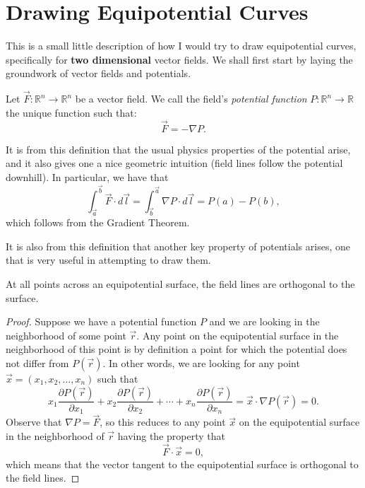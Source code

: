 \documentclass[a4paper, 12pt]{article}
\begin{document}
\section*{Drawing Equipotential Curves}

This is a small little description of how I would try to draw equipotential curves, specifically for \textbf{two dimensional} vector fields. We shall first start by laying the groundwork of vector fields and potentials.

\begin{sidebox}
    \begin{definition}
            Let \( \vec{F} \colon \mathbb{R}^n \to \mathbb{R}^n \) be a vector field. We call the field's \textit{potential function} \( P \colon \mathbb{R}^n \to \mathbb{R} \) the unique function such that:
        \[
            \vec{F} = - \nabla P
        .\]
    \end{definition}
\end{sidebox}

It is from this definition that the usual physics properties of the potential arise, and it also gives one a nice geometric intuition (field lines follow the potential downhill). In particular, we have that
\[
    \int_{\vec{a}}^{\vec{b}} \vec{F} \cdot d\vec{l} = \int_{\vec{b}}^{\vec{a}} \nabla P \cdot d\vec{l} = P(a) - P(b)
,\]
which follows from the Gradient Theorem.

It is also from this definition that another key property of potentials arises, one that is very useful in attempting to draw them.

\begin{sidebox}
    \begin{claim}
        At all points across an equipotential surface, the field lines are orthogonal to the surface.
    \end{claim}
\end{sidebox}

\begin{proof}
    Suppose we have a potential function \( P \) and we are looking in the neighborhood of some point \( \vec{r} \). Any point on the equipotential surface in the neighborhood of this point is by definition a point for which the potential does not differ from \( P(\vec{r}) \). In other words, we are looking for any point \( \vec{x} = (x_1, x_2, \ldots, x_n) \) such that
    \[
        x_1 \frac{\partial P(\vec{r})}{\partial x_1} + x_2 \frac{\partial P(\vec{r})}{\partial x_2} + \cdots + x_n \frac{\partial P(\vec{r})}{\partial x_n} = \vec{x} \cdot \nabla P(\vec{r}) = 0
    .\]
    Observe that \( \nabla P = \vec{F} \), so this reduces to any point \( \vec{x} \) on the equipotential surface in the neighborhood of \( \vec{r} \) having the property that
    \[
        \vec{F} \cdot \vec{x} = 0
    ,\]
    which means that the vector tangent to the equipotential surface is orthogonal to the field lines.
\end{proof}
\end{document}
